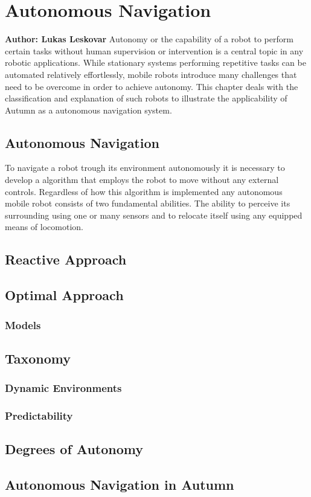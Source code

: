 \chapter{Autonomous Navigation}

\textbf{Author: Lukas Leskovar} 
Autonomy or the capability of a robot to perform certain tasks without human supervision or intervention is a central topic in any robotic applications.
While stationary systems performing repetitive tasks can be automated relatively effortlessly, mobile robots introduce many challenges that need to be overcome in order to achieve autonomy.
This chapter deals with the classification and explanation of such robots to illustrate the applicability of Autumn as a autonomous navigation system.

\section{Autonomous Navigation}
To navigate a robot trough its environment autonomously it is necessary to develop a algorithm that employs the robot to move without any external controls. Regardless of how this algorithm is implemented any autonomous mobile robot consists of two fundamental abilities. The ability to perceive its surrounding using one or many  sensors and to relocate itself using any equipped means of locomotion. 

\section{Reactive Approach}

\section{Optimal Approach}

\subsection{Models}

\section{Taxonomy}

\subsection{Dynamic Environments}

\subsection{Predictability}

\section{Degrees of Autonomy}

\section{Autonomous Navigation in Autumn}


\filbreak